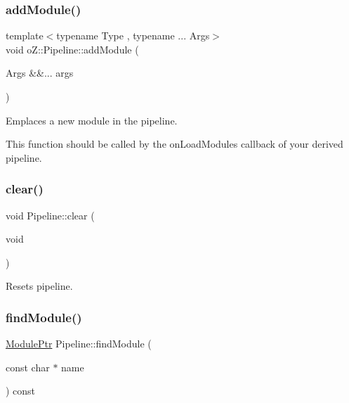 \subsubsection{\texorpdfstring{addModule()}{addModule()}\hspace{0.1cm}{\footnotesize\ttfamily [2/2]}}
{\footnotesize\ttfamily template$<$typename Type , typename ... Args$>$ \\
void o\+Z\+::\+Pipeline\+::add\+Module (\begin{DoxyParamCaption}\item[{Args \&\&...}]{args }\end{DoxyParamCaption})}



Emplaces a new module in the pipeline. 

This function should be called by the on\+Load\+Modules callback of your derived pipeline. \mbox{\label{classo_z_1_1_pipeline_a7ba573fcba5ea0a749ca1c214bd031f5}} 
\subsubsection{\texorpdfstring{clear()}{clear()}}
{\footnotesize\ttfamily void Pipeline\+::clear (\begin{DoxyParamCaption}\item[{void}]{ }\end{DoxyParamCaption})}



Resets pipeline. 

\mbox{\label{classo_z_1_1_pipeline_aa8aa56af891b2d889e7c21198daa1451}} 
\subsubsection{\texorpdfstring{findModule()}{findModule()}\hspace{0.1cm}{\footnotesize\ttfamily [1/2]}}
{\footnotesize\ttfamily \mbox{\hyperlink{namespaceo_z_af5a56aaaee027504979038f38991adcf}{Module\+Ptr}} Pipeline\+::find\+Module (\begin{DoxyParamCaption}\item[{const char $\ast$}]{name }\end{DoxyParamCaption}) const}



